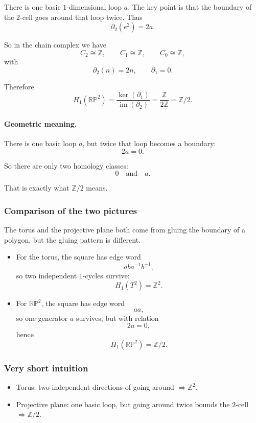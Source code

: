 \documentclass[12pt,a4paper]{article}
\theoremstyle{notespace}
\begin{document}
There is one basic \(1\)-dimensional loop \(a\). The key point is that the boundary of the \(2\)-cell goes around that loop twice. Thus
\[
\partial_2(e^2)=2a.
\]

So in the chain complex we have
\[
C_2 \cong \mathbb Z,\qquad C_1 \cong \mathbb Z,\qquad C_0 \cong \mathbb Z,
\]
with
\[
\partial_2(n)=2n,\qquad \partial_1=0.
\]

Therefore
\[
H_1(\mathbb{RP}^2)
=
\frac{\ker(\partial_1)}{\operatorname{im}(\partial_2)}
=
\frac{\mathbb Z}{2\mathbb Z}
=
\mathbb Z/2.
\]

\paragraph{Geometric meaning.}
There is one basic loop \(a\), but twice that loop becomes a boundary:
\[
2a=0.
\]

So there are only two homology classes:
\[
0 \quad\text{and}\quad a.
\]

That is exactly what \(\mathbb Z/2\) means.

\subsubsection{Comparison of the two pictures}

The torus and the projective plane both come from gluing the boundary of a polygon, but the gluing pattern is different.

\begin{itemize}
	\item For the torus, the square has edge word
	\[
	aba^{-1}b^{-1},
	\]
	so two independent \(1\)-cycles survive:
	\[
	H_1(T^2)=\mathbb Z^2.
	\]
	
	\item For \(\mathbb{RP}^2\), the square has edge word
	\[
	aa,
	\]
	so one generator \(a\) survives, but with relation
	\[
	2a=0,
	\]
	hence
	\[
	H_1(\mathbb{RP}^2)=\mathbb Z/2.
	\]
\end{itemize}

\subsubsection{Very short intuition}

\begin{itemize}
	\item Torus: two independent directions of going around \(\Rightarrow \mathbb Z^2\).
	\item Projective plane: one basic loop, but going around twice bounds the \(2\)-cell \(\Rightarrow \mathbb Z/2\).
\end{itemize}
\end{document}
